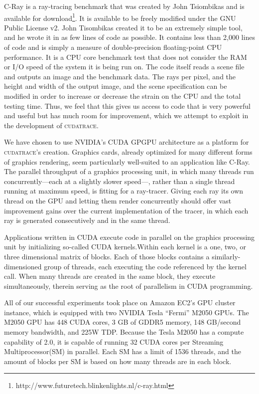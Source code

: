 \documentclass[12pt]{article}
\begin{document}
C-Ray is a ray-tracing benchmark that was created by John Tsiombikas and is available for download\footnote{{http://www.futuretech.blinkenlights.nl/c-ray.html}}. It is available to be freely modified under the GNU Public License v2. John Tisombikas created it to be an extremely simple tool, and he wrote it in as few lines of code as possible. It contains less than 2,000 lines of code and is simply a measure of double-precision floating-point CPU performance. It is a CPU core benchmark test that does not consider the RAM or I/O speed of the system it is being run on. The code itself reads a scene file and outputs an image and the benchmark data. The rays per pixel, and the height and width of the output image, and the scene specification can be modified in order to increase or decrease the strain on the CPU and the total testing time. Thus, we feel that this gives us access to code that is very powerful and useful but has much room for improvement, which we attempt to exploit in the development of \textsc{cudatrace}.

We have chosen to use NVIDIA's CUDA GPGPU architecture as a platform for \textsc{cudatrace}'s creation. Graphics cards, already optimized for many different forms of graphics rendering, seem particularly well-suited to an application like C-Ray. The parallel throughput of a graphics processing unit, in which many threads run concurrently---each at a slightly slower speed---, rather than a single thread running at maximum speed, is fitting for a ray-tracer. Giving each ray its own thread on the GPU and letting them render concurrently should offer vast improvement gains over the current implementation of the tracer, in which each ray is generated consecutively and in the same thread.

Applications written in CUDA execute code in parallel on the graphics processing unit by initializing so-called CUDA kernels.Within each kernel is a one, two, or three dimensional matrix of blocks. Each of those blocks contains a similarly-dimensioned group of threads, each executing the code referenced by the kernel call. When many threads are created in the same block, they execute simultaneously, therein serving as the root of parallelism in CUDA programming.

All of our successful experiments took place on Amazon EC2's GPU cluster instance, which is equipped with two NVIDIA Tesla “Fermi” M2050 GPUs. The M2050 GPU has 448 CUDA cores, 3 GB of GDDR5 memory, 148 GB/second memory bandwidth, and 225W TDP. Because the Tesla M2050 has a compute capability of 2.0, it is capable of running 32  CUDA cores per Streaming Multiprocessor(SM) in parallel. Each SM has a limit of 1536 threads, and the amount of blocks per SM is based on how many threads are in each block.
\end{document}
